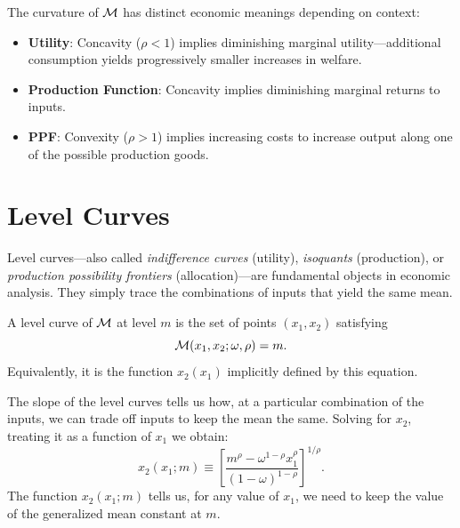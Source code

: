 \begin{calloutnote}
The curvature of $\mathcal{M}$ has distinct economic meanings depending on context:
\begin{itemize}[leftmargin=1.5em]
    \item \textbf{Utility}: Concavity ($\rho < 1$) implies diminishing marginal utility---additional consumption yields progressively smaller increases in welfare.
    \item \textbf{Production Function}: Concavity implies diminishing marginal returns to inputs.
    \item \textbf{PPF}: Convexity ($\rho > 1$) implies increasing costs to increase output along one of the possible production goods.
\end{itemize}
\end{calloutnote}

\section{Level Curves}
\label{sec:level-curves}

Level curves---also called \emph{indifference curves} (utility), \emph{isoquants} (production), or \emph{production possibility frontiers} (allocation)---are fundamental objects in economic analysis. They simply trace the combinations of inputs that yield the same mean. 
\begin{definition}
\label{def:level-curve}
A level curve of $\mathcal{M}$ at level $m$ is the set of points $(x_1, x_2)$ satisfying
\begin{equation}
\mathcal{M}(x_1, x_2; \omega, \rho) = m.
\end{equation}
Equivalently, it is the function $x_2(x_1)$ implicitly defined by this equation.
\end{definition}
The slope of the level curves tells us how, at a particular combination of the inputs, we can trade off inputs to keep the mean the same. Solving for $x_2$, treating it as a function of $x_1$ we obtain:
\begin{equation}
\label{eq:level-curve-explicit}
x_2(x_1;m) \equiv \left[ \frac{m^\rho - \omega^{1-\rho} x_1^\rho}{(1-\omega)^{1-\rho}} \right]^{1/\rho}.
\end{equation}
The function $x_2(x_1;m)$ tells us, for any value of $x_1$, we need to keep the value of the generalized mean constant at $m$. 

